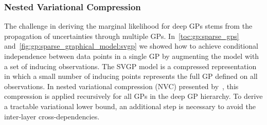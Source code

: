 \subsubsection{Nested Variational Compression}
The challenge in deriving the marginal likelihood for deep GPs stems from the propagation of uncertainties through multiple GPs.
In~\cref{toc:gp:sparse_gps} and~\cref{fig:gp:sparse_graphical_model:svgp} we showed how to achieve conditional independence between data points in a single GP by augmenting the model with a set of inducing observations.
The SVGP model is a compressed representation in which a small number of inducing points represents the full GP defined on all observations.
In nested variational compression (NVC) presented by~\textcite{hensman_nested_2014}, this compression is applied recursively for all GPs in the deep GP hierarchy.
To derive a tractable variational lower bound, an additional step is necessary to avoid the inter-layer cross-dependencies.

